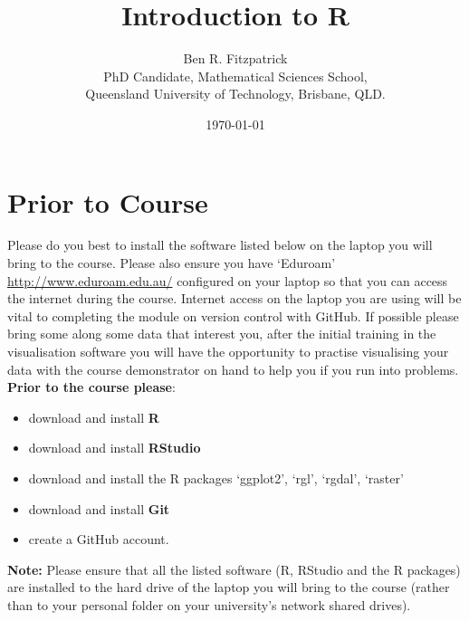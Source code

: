 \documentclass{article}[12pt]
\begin{document}
\title{Introduction to R}
\author{Ben R. Fitzpatrick\\ 
\small PhD Candidate, Mathematical Sciences School,\\
\small Queensland University of Technology, Brisbane, QLD.}
\date{\today}
\maketitle

\section*{Prior to Course}
Please do you best to install the software listed below on the laptop you will bring to the course.
Please also ensure you have `Eduroam' \url{http://www.eduroam.edu.au/} configured on your laptop so that you can access the internet during the course.  
Internet access on the laptop you are using will be vital to completing the module on version control with GitHub.
If possible please bring some along some data that interest you, after the initial training in the visualisation software you will have the opportunity to practise visualising your data with the course demonstrator on hand to help you if you run into problems.
\newline
\newline
\textbf{Prior to the course please}: \begin{itemize}
\item download and install \textbf{R}
\item download and install \textbf{RStudio}
\item download and install the R packages `ggplot2', `rgl', `rgdal', `raster'
\item download and install \textbf{Git}
\item create a GitHub account. \end{itemize}

\textbf{Note:} Please ensure that all the listed software (R, RStudio and the R packages) are installed to the hard drive of the laptop you will bring to the course (rather than to your personal folder on your university's network shared drives).
\end{document}
